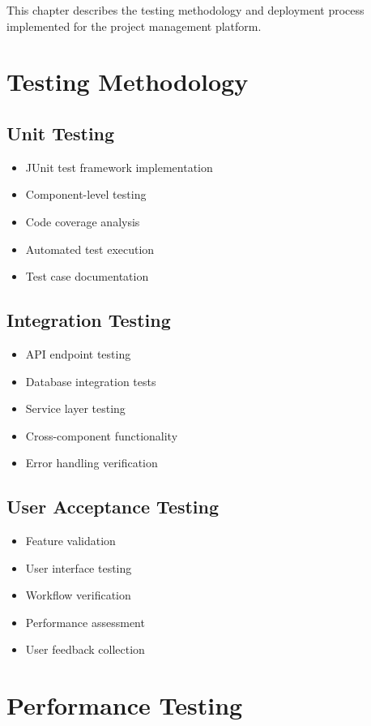 This chapter describes the testing methodology and deployment process implemented for the project management platform.

\section{Testing Methodology}
\subsection{Unit Testing}
\begin{itemize}
    \item JUnit test framework implementation
    \item Component-level testing
    \item Code coverage analysis
    \item Automated test execution
    \item Test case documentation
\end{itemize}

\subsection{Integration Testing}
\begin{itemize}
    \item API endpoint testing
    \item Database integration tests
    \item Service layer testing
    \item Cross-component functionality
    \item Error handling verification
\end{itemize}

\subsection{User Acceptance Testing}
\begin{itemize}
    \item Feature validation
    \item User interface testing
    \item Workflow verification
    \item Performance assessment
    \item User feedback collection
\end{itemize}

\section{Performance Testing}
